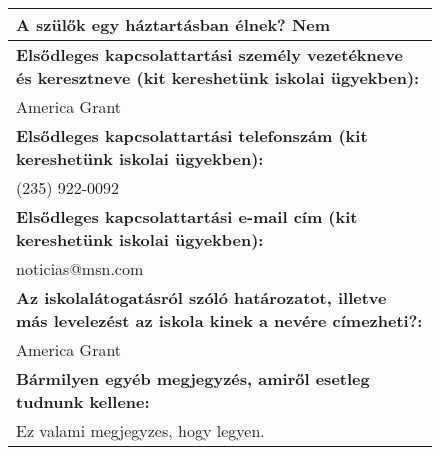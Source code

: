 \documentclass[10pt,a4paper]{article}
\begin{document}
\begin{figure}[!ht]
\begin{tabular}{|m{\textwidth}|}
\hline\vspace{3pt}
\textbf{A szülők egy háztartásban élnek? } \hspace{0.5cm} Nem \vspace{3pt} \\
\hline\vspace{3pt}
\textbf{Elsődleges kapcsolattartási személy vezetékneve és keresztneve (kit kereshetünk iskolai ügyekben):} \\ \hspace{0.5cm} America Grant \vspace{3pt} \\
\hline\vspace{3pt}
\textbf{Elsődleges kapcsolattartási telefonszám (kit kereshetünk iskolai ügyekben):} \\ \hspace{0.5cm} (235) 922-0092 \vspace{3pt} \\
\hline\vspace{3pt}
\textbf{Elsődleges kapcsolattartási e-mail cím (kit kereshetünk iskolai ügyekben):} \\ \hspace{0.5cm} noticias@msn.com \vspace{3pt} \\
\hline\vspace{3pt}
\textbf{Az iskolalátogatásról szóló határozatot, illetve más levelezést az iskola kinek a nevére címezheti?:} \\ \hspace{0.5cm} America Grant \vspace{3pt} \\
\hline\vspace{3pt}
\textbf{Bármilyen egyéb megjegyzés, amiről esetleg tudnunk kellene:} \\ \hspace{0.5cm} Ez valami megjegyzes, hogy legyen. \vspace{3pt} \\


\end{tabular}
\end{figure}
\end{document}
